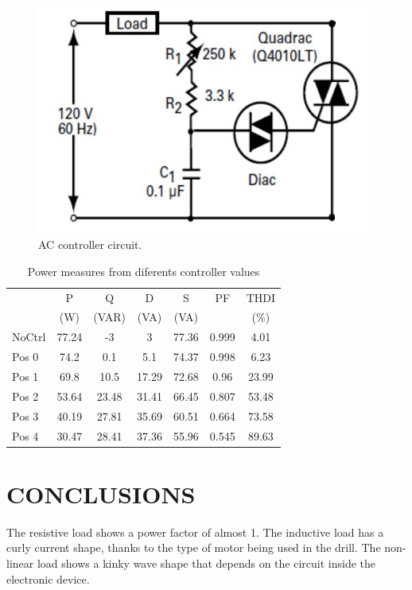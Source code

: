 \documentclass[journal]{IEEEtran}
\begin{document}
\begin{figure}[h]
\centering
\includegraphics[clip,width=\columnwidth]{controller.png}
\caption{AC controller circuit.}
\label{ACcontroller}
\end{figure}

\begin{table}
\caption{Power measures from diferents controller values}
\begin{tabular}{|p{1.2cm}|c|c|c|c|c|c|}
\hline 
 & P  & Q  & D  & S  & PF & THDI  \\
 &(W) & (VAR) &(VA) & (VA) &  & (\%) \\ \hline  
NoCtrl & 77.24 & -3 & 3 & 77.36 & 0.999 & 4.01 \\ 
\hline 
Pos 0 & 74.2 & 0.1 & 5.1 & 74.37 & 0.998 & 6.23 \\ 
\hline 
Pos 1 & 69.8 & 10.5 & 17.29 & 72.68 & 0.96 & 23.99 \\
\hline 
Pos 2 & 53.64 & 23.48 & 31.41 & 66.45 & 0.807 & 53.48 \\
\hline 
Pos 3 & 40.19 & 27.81 & 35.69 & 60.51 & 0.664 & 73.58 \\ 
\hline
Pos 4 & 30.47 & 28.41 & 37.36 & 55.96 & 0.545 & 89.63 \\ 
\hline 
\end{tabular}
\end{table}

\section{CONCLUSIONS}

The resistive load shows a power factor of almost 1. 
The inductive load has a curly current shape, thanks to 
the type of motor being used in the drill. The 
non-linear load shows a kinky wave shape that 
depends on the circuit inside the electronic device.\\
\end{document}
